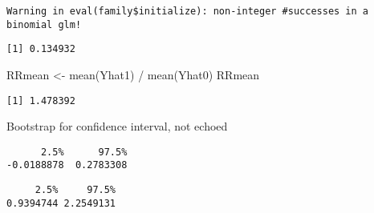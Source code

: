 \documentclass[
  letterpaper,
  DIV=11,
  numbers=noendperiod]{scrartcl}
\newenvironment{Shaded}{\begin{snugshade}}{\end{snugshade}}
\newcommand{\AttributeTok}[1]{\textcolor[rgb]{0.40,0.45,0.13}{#1}}
\newcommand{\DecValTok}[1]{\textcolor[rgb]{0.68,0.00,0.00}{#1}}
\newcommand{\DocumentationTok}[1]{\textcolor[rgb]{0.37,0.37,0.37}{\textit{#1}}}
\newcommand{\FunctionTok}[1]{\textcolor[rgb]{0.28,0.35,0.67}{#1}}
\newcommand{\NormalTok}[1]{\textcolor[rgb]{0.00,0.23,0.31}{#1}}
\newcommand{\OtherTok}[1]{\textcolor[rgb]{0.00,0.23,0.31}{#1}}
\newcommand{\SpecialCharTok}[1]{\textcolor[rgb]{0.37,0.37,0.37}{#1}}
\newcommand{\StringTok}[1]{\textcolor[rgb]{0.13,0.47,0.30}{#1}}
\begin{document}
\begin{verbatim}
Warning in eval(family$initialize): non-integer #successes in a binomial glm!
\end{verbatim}

\begin{Shaded}
\end{Shaded}

\begin{verbatim}
[1] 0.134932
\end{verbatim}

\begin{Shaded}
\begin{Highlighting}[]
\NormalTok{RRmean }\OtherTok{\textless{}{-}} \FunctionTok{mean}\NormalTok{(Yhat1) }\SpecialCharTok{/} \FunctionTok{mean}\NormalTok{(Yhat0)}
\NormalTok{RRmean}
\end{Highlighting}
\end{Shaded}

\begin{verbatim}
[1] 1.478392
\end{verbatim}

Bootstrap for confidence interval, not echoed

\begin{verbatim}
      2.5%      97.5% 
-0.0188878  0.2783308 
\end{verbatim}

\begin{verbatim}
     2.5%     97.5% 
0.9394744 2.2549131 
\end{verbatim}
\end{document}
